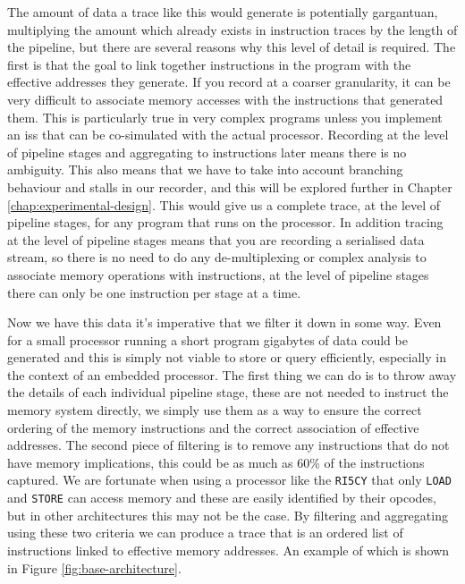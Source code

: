 The amount of data a trace like this would generate is potentially gargantuan, multiplying the amount which already exists in instruction traces by the length of the pipeline, but there are several reasons why this level of detail is required. The first is that the goal to link together instructions in the program with the effective addresses they generate. If you record at a coarser granularity, it can be very difficult to associate memory accesses with the instructions that generated them. This is particularly true in very complex programs unless you implement an \gls{iss} that can be co-simulated with the actual processor. Recording at the level of pipeline stages and aggregating to instructions later means there is no ambiguity. This also means that we have to take into account branching behaviour and stalls in our recorder, and this will be explored further in Chapter \ref{chap:experimental-design}. This would give us a complete trace, at the level of pipeline stages, for any program that runs on the processor. In addition tracing at the level of pipeline stages means that you are recording a serialised data stream, so there is no need to do any de-multiplexing or complex analysis to associate memory operations with instructions, at the level of pipeline stages there can only be one instruction per stage at a time. 

Now we have this data it's imperative that we filter it down in some way. Even for a small processor running a short program gigabytes of data could be generated and this is simply not viable to store or query efficiently, especially in the context of an embedded processor. The first thing we can do is to throw away the details of each individual pipeline stage, these are not needed to instruct the memory system directly, we simply use them as a way to ensure the correct ordering of the memory instructions and the correct association of effective addresses. The second piece of filtering is to remove any instructions that do not have memory implications, this could be as much as 60\% of the instructions captured. We are fortunate when using a processor like the \texttt{RI5CY} that only \texttt{LOAD} and \texttt{STORE} can access memory and these are easily identified by their opcodes, but in other architectures this may not be the case. By filtering and aggregating using these two criteria we can produce a trace that is an ordered list of instructions linked to effective memory addresses. An example of which is shown in Figure \ref{fig:base-architecture}.

